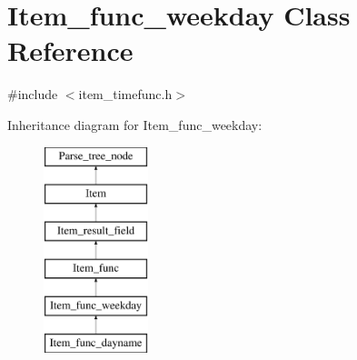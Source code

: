 \hypertarget{classItem__func__weekday}{}\section{Item\+\_\+func\+\_\+weekday Class Reference}
\label{classItem__func__weekday}


{\ttfamily \#include $<$item\+\_\+timefunc.\+h$>$}

Inheritance diagram for Item\+\_\+func\+\_\+weekday\+:\begin{figure}[H]
\begin{center}
\leavevmode
\includegraphics[height=6.000000cm]{classItem__func__weekday}
\end{center}
\end{figure}
